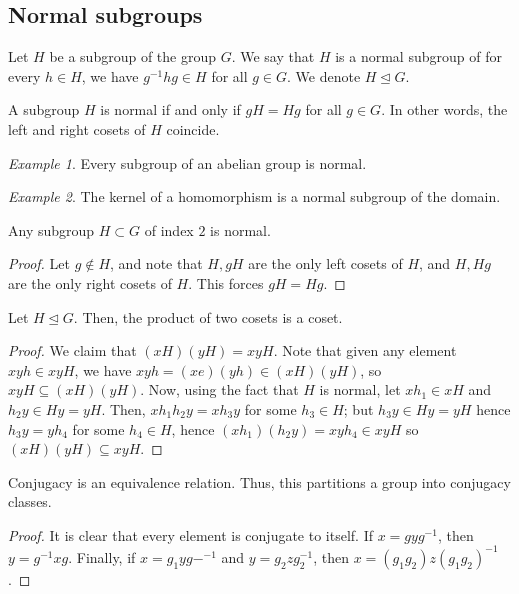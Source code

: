 \documentclass[11pt]{article}
\theoremstyle{definition}
\theoremstyle{remark}
\newtheorem*{example}{Example}
\numberwithin{equation}{section}
\begin{document}
    \subsection{Normal subgroups}
    \begin{definition}
        Let $H$ be a subgroup of the group $G$. We say that $H$ is a normal subgroup
        of for every $h \in H$, we have $g^{-1} hg \in H$ for all $g \in G$. We
        denote $H \trianglelefteq G$.
    \end{definition}
    \begin{lemma}
        A subgroup $H$ is normal if and only if $gH = Hg$ for all $g \in G$. In other
        words, the left and right cosets of $H$ coincide.
    \end{lemma}
    \begin{example}
        Every subgroup of an abelian group is normal.
    \end{example}
    \begin{example}
        The kernel of a homomorphism is a normal subgroup of the domain.
    \end{example}

    \begin{corollary}
        Any subgroup $H \subset G$ of index $2$ is normal.
    \end{corollary}
    \begin{proof}
        Let $g \notin H$, and note that $H, gH$ are the only left cosets of $H$,
        and $H, Hg$ are the only right cosets of $H$. This forces $gH = Hg$.
    \end{proof}

    \begin{lemma}
        Let $H \trianglelefteq G$. Then, the product of two cosets is a coset.
    \end{lemma}
    \begin{proof}
        We claim that $(xH)(yH) = xyH$. Note that given any element $xyh \in xyH$, we
        have $xyh = (xe)(yh) \in (xH)(yH)$, so $xyH \subseteq (xH)(yH)$. Now, using
        the fact that $H$ is normal, let $xh_1 \in xH$ and $h_2y \in Hy = yH$. Then,
        $xh_1h_2y = xh_3y$ for some $h_3 \in H$; but $h_3y \in Hy = yH$ hence $h_3y =
        yh_4$ for some $h_4 \in H$, hence $(xh_1)(h_2y) = xyh_4 \in xyH$ so $(xH)(yH)
        \subseteq xyH$.
    \end{proof}

    \begin{lemma}
        Conjugacy is an equivalence relation. Thus, this partitions a group into
        conjugacy classes.
    \end{lemma}
    \begin{proof}
        It is clear that every element is conjugate to itself. If $x = gyg^{-1}$,
        then $y = g^{-1}xg$. Finally, if $x = g_1yg-^{-1}$ and $y = g_2zg_2^{-1}$,
        then $x = (g_1g_2)z(g_1g_2)^{-1}$.
    \end{proof}
\end{document}
